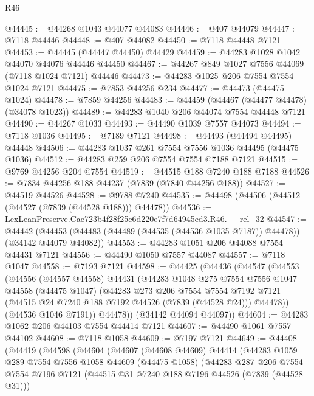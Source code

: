 \begin{lexlean}{R46}
\begin{coremodule}
@44445 := @44268 @1043 @44077 @44083
@44446 := @407 @44079
@44447 := @7118 @44446
@44448 := @407 @44082
@44450 := @7118 @44448 @7121
@44453 := @44445 (@44447 @44450) @44429
@44459 := @44283 @1028 @1042 @44070 @44076 @44446 @44450
@44467 := @44267 @849 @1027 @7556 @44069 (@7118 @1024 @7121) @44446
@44473 := @44283 @1025 @206 @7554 @7554 @1024 @7121
@44475 := @7853 @44256 @234
@44477 := @44473 (@44475 @1024)
@44478 := @7859 @44256
@44483 := @44459 (@44467 (@44477 @44478) (@34078 @1023))
@44489 := @44283 @1040 @206 @44074 @7554 @44448 @7121
@44490 := @44267 @1033
@44493 := @44490 @1039 @7557 @44073
@44494 := @7118 @1036
@44495 := @7189 @7121
@44498 := @44493 (@44494 @44495) @44448
@44506 := @44283 @1037 @261 @7554 @7556 @1036 @44495 (@44475 @1036)
@44512 := @44283 @259 @206 @7554 @7554 @7188 @7121
@44515 := @9769 @44256 @204 @7554
@44519 := @44515 @188 @7240 @188 @7188
@44526 := @7834 @44256 @188 @44237 (@7839 (@7840 @44256 @188))
@44527 := @44519 @44526
@44528 := @9788 @7240
@44535 := @44498 (@44506 (@44512 (@44527 (@7839 (@44528 @188))) @44478))
@44536 := LexLeanPreserve.Cae723b4f28f25c6d220e7f7d64945ed3.R46.__rel_32
@44547 := @44442
    (@44453 (@44483 (@44489 (@44535 (@44536 @1035 @7187)) @44478)) (@34142 @44079 @44082))
@44553 := @44283 @1051 @206 @44088 @7554 @44431 @7121
@44556 := @44490 @1050 @7557 @44087
@44557 := @7118 @1047
@44558 := @7193 @7121
@44598 := @44425
    (@44436
      (@44547
        (@44553
          (@44556
            (@44557 @44558)
            @44431
            (@44283
              @1048
              @275
              @7554
              @7556
              @1047
              @44558
              (@44475 @1047)
              (@44283
                @273
                @206
                @7554
                @7554
                @7192
                @7121
                (@44515 @24 @7240 @188 @7192 @44526 (@7839 (@44528 @24)))
                @44478))
            (@44536 @1046 @7191))
          @44478))
      (@34142 @44094 @44097))
@44604 := @44283 @1062 @206 @44103 @7554 @44414 @7121
@44607 := @44490 @1061 @7557 @44102
@44608 := @7118 @1058
@44609 := @7197 @7121
@44649 := @44408
    (@44419
      (@44598
        (@44604
          (@44607
            (@44608 @44609)
            @44414
            (@44283
              @1059
              @289
              @7554
              @7556
              @1058
              @44609
              (@44475 @1058)
              (@44283
                @287
                @206
                @7554
                @7554
                @7196
                @7121
                (@44515 @31 @7240 @188 @7196 @44526 (@7839 (@44528 @31)))

\end{coremodule}
\end{lexlean}
